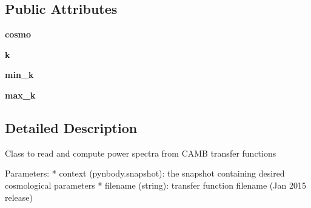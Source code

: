 \subsection*{Public Attributes}
\begin{DoxyCompactItemize}
\item 
\hypertarget{classseren3_1_1cosmology_1_1transfer__function_1_1PowerSpectrumCamb_a3602e4c12364783e3c388ed94bb70582}{
{\bfseries cosmo}}
\label{classseren3_1_1cosmology_1_1transfer__function_1_1PowerSpectrumCamb_a3602e4c12364783e3c388ed94bb70582}

\item 
\hypertarget{classseren3_1_1cosmology_1_1transfer__function_1_1PowerSpectrumCamb_a7c96d1817e4e6059b91e935062733835}{
{\bfseries k}}
\label{classseren3_1_1cosmology_1_1transfer__function_1_1PowerSpectrumCamb_a7c96d1817e4e6059b91e935062733835}

\item 
\hypertarget{classseren3_1_1cosmology_1_1transfer__function_1_1PowerSpectrumCamb_aebaded5aaff333970d10a0bcd7b3b8ce}{
{\bfseries min\_\-k}}
\label{classseren3_1_1cosmology_1_1transfer__function_1_1PowerSpectrumCamb_aebaded5aaff333970d10a0bcd7b3b8ce}

\item 
\hypertarget{classseren3_1_1cosmology_1_1transfer__function_1_1PowerSpectrumCamb_af8feeffedd36e993fca7d97d7ef79bde}{
{\bfseries max\_\-k}}
\label{classseren3_1_1cosmology_1_1transfer__function_1_1PowerSpectrumCamb_af8feeffedd36e993fca7d97d7ef79bde}

\end{DoxyCompactItemize}


\subsection{Detailed Description}
\begin{DoxyVerb}
Class to read and compute power spectra from CAMB transfer functions

Parameters:
        * context (pynbody.snapshot): the snapshot containing desired cosmological parameters
        * filename (string): transfer function filename (Jan 2015 release)
\end{DoxyVerb}
 

